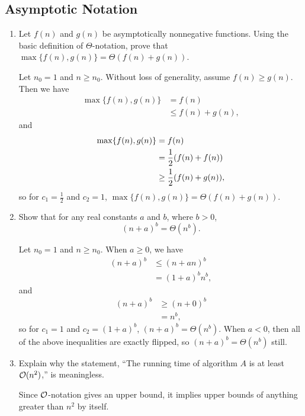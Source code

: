\documentclass[Chapter03]{subfiles}
\begin{document}
	\subsection{Asymptotic Notation}

	\begin{enumerate}
		\item Let $f(n)$ and $g(n)$ be asymptotically nonnegative functions. Using the basic definition of $\Theta$-notation, prove that $\max\{f(n), g(n)\} = \Theta(f(n) + g(n))$.
		\begin{answer}
			Let $n_0 = 1$ and $n \geq n_0$. Without loss of generality, assume $f(n) \geq g(n)$. Then we have
			\begin{align*}
				\max\{f(n), g(n)\} &= f(n)\\
					&\leq f(n) + g(n),
			\end{align*}
			and
			\begin{align*}
				\max\{f(n), g(n)\} &= f(n)\\
					&= \frac{1}{2}\qty(f(n) + f(n))\\
					&\geq \frac{1}{2}\qty(f(n) + g(n)),
			\end{align*}
			so for $c_1 = \frac{1}{2}$ and $c_2 = 1$, $\max\{f(n), g(n)\} = \Theta(f(n) + g(n))$.
		\end{answer}

		\item Show that for any real constants $a$ and $b$, where $b > 0$,
		\[
			(n + a)^b = \Theta(n^b).
		\]
		\begin{answer}
			Let $n_0 = 1$ and $n \geq n_0$. When $a \geq 0$, we have
			\begin{align*}
				(n + a)^b &\leq (n + an)^b\\
					&= (1 + a)^bn^b,
			\end{align*}
			and
			\begin{align*}
				(n + a)^b &\geq (n + 0)^b\\
					&= n^b,
			\end{align*}
			so for $c_1 = 1$ and $c_2 = (1 + a)^b$, $(n + a)^b = \Theta(n^b)$. When $a < 0$, then all of the above inequalities are exactly flipped, so $(n + a)^b = \Theta(n^b)$ still.
		\end{answer}

		\item Explain why the statement, ``The running time of algorithm $A$ is at least $\mathcal{O}(n^2)$,'' is meaningless.
		\begin{answer}
			Since $\mathcal{O}$-notation gives an upper bound, it implies upper bounds of anything greater than $n^2$ by itself.
		\end{answer}


\end{enumerate}
\end{document}
